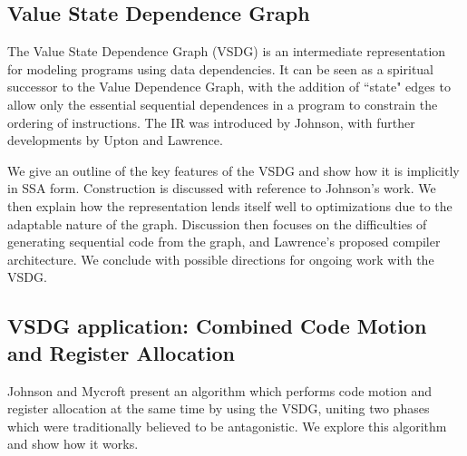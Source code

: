 \subsection*{Value State Dependence Graph}

The Value State Dependence Graph (VSDG) is an intermediate representation for modeling programs using data dependencies. It can be seen as a spiritual successor to the Value Dependence Graph\cite{177907}, with the addition of ``state" edges to allow only the essential sequential dependences in a program to constrain the ordering of instructions. The IR was introduced by Johnson\cite{UCAM-CL-TR-607}, with further developments by Upton\cite{upton} and Lawrence\cite{UCAM-CL-TR-705}.

We give an outline of the key features of the VSDG and show how it is implicitly in SSA form. Construction is discussed with reference to Johnson's work. We then explain how the representation lends itself well to optimizations due to the adaptable nature of the graph. Discussion then focuses on the difficulties of generating sequential code from the graph\cite{DBLP:conf/pdpta/Upton03}, and Lawrence's proposed compiler architecture. We conclude with possible directions for ongoing work with the VSDG.

\subsection*{VSDG application: Combined Code Motion and Register Allocation}

Johnson and Mycroft \cite{johnson-combined} present an algorithm which performs code motion and register allocation at the same time by using the VSDG, uniting two phases which were traditionally believed to be antagonistic. We explore this algorithm and show how it works.


